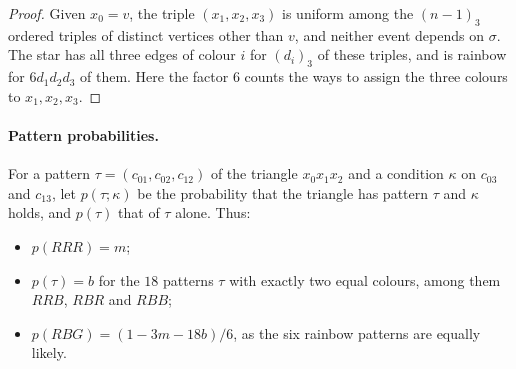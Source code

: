 \documentclass[11pt]{article}
\theoremstyle{spacedplain}
\theoremstyle{spaceddef}
\theoremstyle{spacedremark}
\begin{document}
\begin{proof}
Given $x_0=v$, the triple $(x_1,x_2,x_3)$ is uniform among the $(n-1)_3$ ordered triples of distinct vertices other than $v$, and neither event depends on $\sigma$.
The star has all three edges of colour $i$ for $(d_i)_3$ of these triples, and is rainbow for $6d_1d_2d_3$ of them.
Here the factor $6$ counts the ways to assign the three colours to $x_1,x_2,x_3$.
\end{proof}

\paragraph{Pattern probabilities.}
For a pattern $\tau=(c_{01},c_{02},c_{12})$ of the triangle $x_0x_1x_2$ and a condition $\kappa$ on $c_{03}$ and $c_{13}$, let $p(\tau;\kappa)$ be the probability that the triangle has pattern $\tau$ and $\kappa$ holds, and $p(\tau)$ that of $\tau$ alone.
Thus:
\begin{itemize}
\item $p(RRR)=m$;
\item $p(\tau)=b$ for the $18$ patterns $\tau$ with exactly two equal colours, among them $RRB$, $RBR$ and $RBB$;
\item $p(RBG)=(1-3m-18b)/6$, as the six rainbow patterns are equally likely.
\end{itemize}
\end{document}

